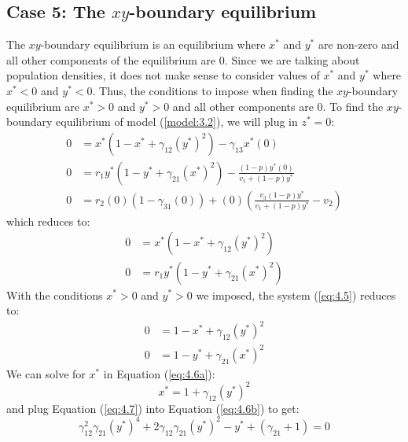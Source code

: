 \subsection{Case 5: The $xy$-boundary equilibrium}\label{subsec:xy_boundary_equilibrium}
The $xy$-boundary equilibrium is an equilibrium where $x^*$ and $y^*$ are non-zero and all other components of the equilibrium are 0. Since we are talking about population densities, it does not make sense to consider values of $x^*$ and $y^*$ where $x^*<0$ and $y^*<0$. Thus, the conditions to impose when finding the $xy$-boundary equilibrium are $x^*>0$ and $y^*>0$ and all other components are 0. To find the $xy$-boundary equilibrium of model (\ref{model:3.2}), we will plug in $z^*=0$:
\begin{align*}
    0 &= x^*\left(1-x^*+\gamma_{12}\left(y^*\right)^2\right)-\gamma_{13}x^*(0)\\
    0 &= r_1y^*\left(1-y^*+\gamma_{21}\left(x^*\right)^2\right)-\frac{\left(1-p\right)y^*(0)}{v_1+\left(1-p\right)y^*}\\
    0 &= r_2(0)\left(1-\gamma_{31}(0)\right)+(0)\left(\frac{v_3\left(1-p\right)y^*}{v_1+\left(1-p\right)y^*}-v_2\right)
\end{align*}
which reduces to:
\begin{subequations}
    \begin{align}
        0 &= x^*\left(1-x^*+\gamma_{12}\left(y^*\right)^2\right)
        \label{eq:4.5a}\\
        0 &= r_1y^*\left(1-y^*+\gamma_{21}\left(x^*\right)^2\right)
        \label{eq:4.5b}
    \end{align}
    \label{eq:4.5}
\end{subequations}
With the conditions $x^*>0$ and $y^*>0$ we imposed, the system (\ref{eq:4.5}) reduces to:
\begin{subequations}
    \begin{align}
        0 &= 1-x^*+\gamma_{12}\left(y^*\right)^2
        \label{eq:4.6a}\\
        0 &= 1-y^*+\gamma_{21}\left(x^*\right)^2
        \label{eq:4.6b}
    \end{align}
    \label{eq:4.6}
\end{subequations}
We can solve for $x^*$ in Equation (\ref{eq:4.6a}):
\begin{equation}
    x^*=1+\gamma_{12}\left(y^*\right)^2
    \label{eq:4.7}
\end{equation}
and plug Equation (\ref{eq:4.7}) into Equation (\ref{eq:4.6b}) to get:
\begin{equation}
    \gamma_{12}^2\gamma_{21}\left(y^*\right)^4+2\gamma_{12}\gamma_{21}\left(y^*\right)^2-y^*+\left(\gamma_{21}+1\right)=0
    \label{eq:4.8}
\end{equation}
